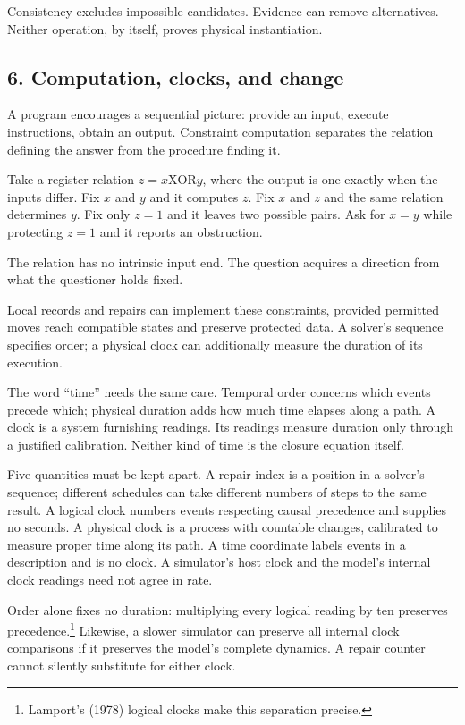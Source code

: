 \documentclass[
  11pt,
]{article}
\begin{document}
Consistency excludes impossible candidates. Evidence can remove
alternatives. Neither operation, by itself, proves physical
instantiation.

\subsection{6. Computation, clocks, and
change}\label{computation-clocks-and-change}

A program encourages a sequential picture: provide an input, execute
instructions, obtain an output. Constraint computation separates the
relation defining the answer from the procedure finding it.

Take a register relation \(z=x\mathbin{\mathrm{XOR}}y\), where the
output is one exactly when the inputs differ. Fix \(x\) and \(y\) and it
computes \(z\). Fix \(x\) and \(z\) and the same relation determines
\(y\). Fix only \(z=1\) and it leaves two possible pairs. Ask for
\(x=y\) while protecting \(z=1\) and it reports an obstruction.

The relation has no intrinsic input end. The question acquires a
direction from what the questioner holds fixed.

Local records and repairs can implement these constraints, provided
permitted moves reach compatible states and preserve protected data. A
solver's sequence specifies order; a physical clock can additionally
measure the duration of its execution.

The word ``time'' needs the same care. Temporal order concerns which
events precede which; physical duration adds how much time elapses along
a path. A clock is a system furnishing readings. Its readings measure
duration only through a justified calibration. Neither kind of time is
the closure equation itself.

Five quantities must be kept apart. A repair index is a position in a
solver's sequence; different schedules can take different numbers of
steps to the same result. A logical clock numbers events respecting
causal precedence and supplies no seconds. A physical clock is a process
with countable changes, calibrated to measure proper time along its
path. A time coordinate labels events in a description and is no clock.
A simulator's host clock and the model's internal clock readings need
not agree in rate.

Order alone fixes no duration: multiplying every logical reading by ten
preserves precedence.\footnote{Lamport's (1978) logical clocks make this
  separation precise.} Likewise, a slower simulator can preserve all
internal clock comparisons if it preserves the model's complete
dynamics. A repair counter cannot silently substitute for either clock.
\end{document}
